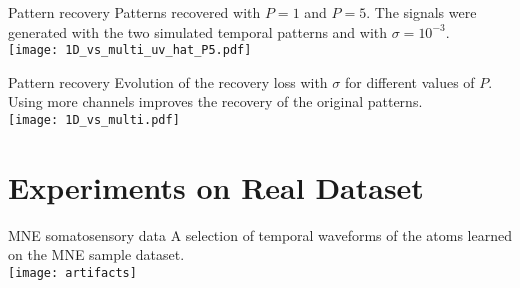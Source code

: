 \documentclass[prez_parietal.tex]{subfiles}
\begin{document}
\begin{frame}{Pattern recovery}
Patterns recovered with $P = 1$ and $P=5$. The signals were generated with the two simulated temporal patterns and with  $\sigma = 10^{-3}$. \\[1em]
\texttt{[image: 1D\_vs\_multi\_uv\_hat\_P5.pdf]}
\end{frame}
\begin{frame}{Pattern recovery}
Evolution of the recovery loss with $\sigma$ for different values of $P$. Using more channels improves the recovery of the original patterns.\\[1em]
\texttt{[image: 1D\_vs\_multi.pdf]}
\end{frame}


\section{Experiments on Real Dataset}

\begin{frame}{MNE somatosensory data}
A selection of temporal waveforms of the atoms learned on the MNE sample dataset.\\
\centering
\texttt{[image: artifacts]}
\end{frame}


    
\end{document}
